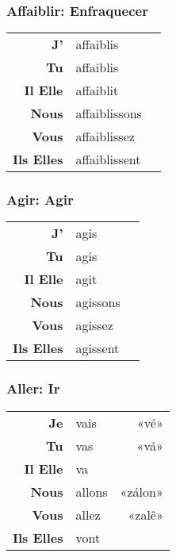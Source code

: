 \documentclass{subfiles}
\begin{document}
    \begin{multicols}{3}
        \raggedcolumns
        \subsubsection{Affaiblir: Enfraquecer}
            \begin{tabular}{r l r}
                \textbf{J'}        & affaiblis     &\\
                \textbf{Tu}        & affaiblis     &\\
                \textbf{Il Elle}   & affaiblit     &\\
                \textbf{Nous}      & affaiblissons &\\
                \textbf{Vous}      & affaiblissez  &\\
                \textbf{Ils Elles} & affaiblissent &
            \end{tabular}

        \subsubsection{Agir: Agir}
            \begin{tabular}{r l r}
                \textbf{J'}        & agis     &\\
                \textbf{Tu}        & agis     &\\
                \textbf{Il Elle}   & agit     &\\
                \textbf{Nous}      & agissons &\\
                \textbf{Vous}      & agissez  &\\
                \textbf{Ils Elles} & agissent &
            \end{tabular}

        \subsubsection{Aller: Ir}
            \begin{tabular}{r l r}
                \textbf{Je}        & vais   & «vé»\\
                \textbf{Tu}        & vas    & «vá»\\
                \textbf{Il Elle}   & va     &\\
                \textbf{Nous}      & allons & «zálon»\\
                \textbf{Vous}      & allez  & «zalê»\\
                \textbf{Ils Elles} & vont   &
            \end{tabular}


\end{multicols}
\end{document}
